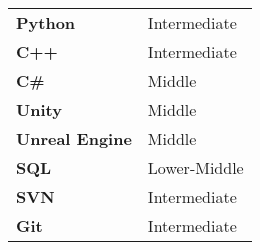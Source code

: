 \documentclass[9pt]{developercv} %
\begin{document}
\vspace{0.5cm}



\begin{center}
	\begin{tabular}{p{}p{}}
		\textbf{Python}        & Intermediate \\
		\textbf{C++}           & Intermediate \\
		\textbf{C\#}           & Middle       \\
		\textbf{Unity}         & Middle       \\
		\textbf{Unreal Engine} & Middle       \\
		\textbf{SQL}           & Lower-Middle \\
		\textbf{SVN}           & Intermediate \\
		\textbf{Git}           & Intermediate \\
	\end{tabular}
\end{center}


\end{document}
